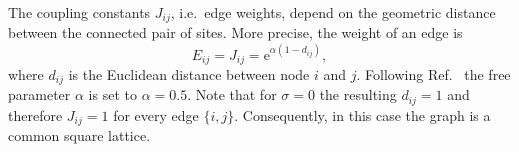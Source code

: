    The coupling constants \(J_{ij}\), i.e.~edge weights, depend on the
    geometric distance between the connected pair of sites. More precise,
    the weight of an edge is
    \begin{equation}
        E_{ij} = J_{ij} = \mathrm{e}^{\alpha (1-d_{ij})},
        \label{eq:coupling}
    \end{equation}
    where \(d_{ij}\) is the Euclidean
    distance between node \(i\) and \(j\). Following Ref.~\cite{Lima2000}
    the free parameter \(\alpha\) is set to \(\alpha = 0.5\).
    Note that for \(\sigma = 0\) the resulting \(d_{ij} = 1\) and therefore
    \(J_{ij} = 1\) for every edge $\{i,j\}$. Consequently, in this case
    the graph is a common square lattice.
